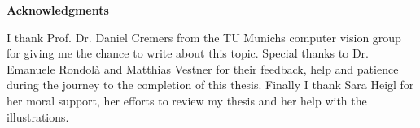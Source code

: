 \clearemptydoublepage
{}
{}	



\vspace*{2cm}

\begin{center}
{\Large \bfseries Acknowledgments}
\end{center}

\vspace{1cm}




I thank Prof. Dr. Daniel Cremers from the TU Munichs computer vision group for giving me the chance to write about this topic.
Special thanks to Dr. Emanuele Rondol\`{a} and Matthias Vestner for their feedback, help and patience during the journey to the completion of this thesis.
Finally I thank Sara Heigl for her moral support, her efforts to review my thesis and her help with the illustrations. 

